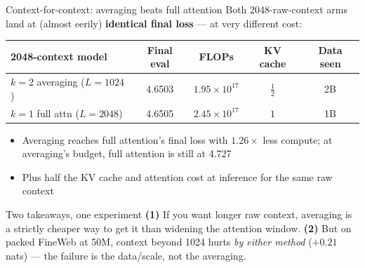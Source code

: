 \documentclass[10pt,aspectratio=169]{beamer}
\newcommand{\good}[1]{\textcolor{okgreen}{#1}}
\begin{document}
\begin{frame}{Context-for-context: averaging \good{beats} full attention}
  Both 2048-raw-context arms land at (almost eerily) \textbf{identical final
  loss} --- at very different cost:

  \vspace{0.5em}
  \centering
  \begin{tabular}{lcccc}
    \toprule
    2048-context model & Final eval & FLOPs & KV cache & Data seen \\
    \midrule
    $k{=}2$ averaging ($L{=}1024$)   & \good{4.6503} & \good{$1.95\times10^{17}$} & \good{$\tfrac12$} & 2B \\
    $k{=}1$ full attn ($L{=}2048$)   & 4.6505 & $2.45\times10^{17}$ & $1$ & 1B \\
    \bottomrule
  \end{tabular}

  \vspace{0.8em}
  \raggedright
  \begin{itemize}
    \item Averaging reaches full attention's final loss with
          \good{$\mathbf{1.26\times}$ less compute}; at averaging's budget,
          full attention is still at 4.727
    \item Plus half the KV cache and attention cost at inference for the same
          raw context
  \end{itemize}

  \vspace{0.4em}
  \begin{block}{Two takeaways, one experiment}
    \textbf{(1)} If you want longer raw context, averaging is a strictly
    cheaper way to get it than widening the attention window.
    \textbf{(2)} But on packed FineWeb at 50M, context beyond 1024 hurts
    \emph{by either method} ($+0.21$ nats) --- the failure is the data/scale,
    not the averaging.
  \end{block}
\end{frame}
\end{document}
